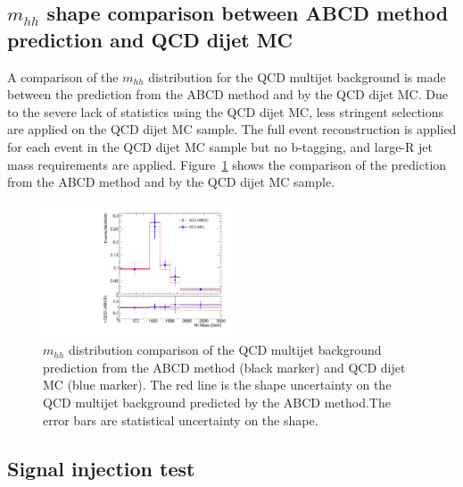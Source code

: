 \FloatBarrier
%
%
\subsection{$m_{hh}$ shape comparison between ABCD method prediction and QCD dijet MC}
\label{app:boosted_qcd_ABCDvsMC_hhMass}
A comparison of the $m_{hh}$ distribution for the QCD multijet background is made between the prediction from the ABCD method
and by the QCD dijet MC. Due to the severe lack of statistics using the QCD dijet MC, less stringent selections are applied on the QCD
dijet MC sample. The full event reconstruction is applied for each event in the QCD dijet MC sample but no b-tagging, \met and large-R jet
mass requirements are applied. Figure~\ref{fit:boosted_qcd_ABCDvsMC_hhMass} shows the comparison of the prediction from the ABCD method
and by the QCD dijet MC sample.

\begin{figure}[!h]
\begin{center}
\includegraphics*[width=0.50\textwidth]{./figures/boosted/ABCD/QCD_MCvsDD2_Rebin}
\caption{$m_{hh}$ distribution comparison of the QCD multijet background prediction from
the ABCD method (black marker) and QCD dijet MC (blue marker). The red line is the shape uncertainty
on the QCD multijet background predicted by the ABCD method.The error bars are statistical uncertainty on the shape.}
\label{fit:boosted_qcd_ABCDvsMC_hhMass}
\end{center}
\end{figure}
\FloatBarrier

%
%
\subsection{Signal injection test}
\label{app:boosted_qcd_signalinject}

